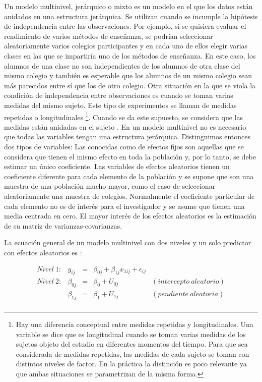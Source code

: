 \documentclass[
  12pt,
  a4paper,
  extrafontsizes,
  onecolumn,
  openright,
  table]{memoir}
\begin{document}
Un modelo multinivel, jerárquico o mixto es un modelo en el que los
datos están anidados en una estructura jerárquica. Se utilizan cuando se
incumple la hipótesis de independencia entre las observaciones. Por
ejemplo, si se quisiera evaluar el rendimiento de varios métodos de
enseñanza, se podrían seleccionar aleatoriamente varios colegios
participantes y en cada uno de ellos elegir varias clases en las que se
impartiría uno de los métodos de enseñanza. En este caso, los alumnos de
una clase no son independientes de los alumnos de otra clase del mismo
colegio y también es esperable que los alumnos de un mismo colegio sean
más parecidos entre sí que los de otro colegio. Otra situación en la que
se viola la condición de independencia entre observaciones es cuando se
toman varias medidas del mismo sujeto. Este tipo de experimentos se
llaman de medidas repetidas o longitudinales \footnote{Hay una
  diferencia conceptual entre medidas repetidas y longitudinales. Una
  variable se dice que es longitudinal cuando se toman varias medidas de
  los sujetos objeto del estudio en diferentes momentos del tiempo. Para
  que sea considerada de medidas repetidas, las medidas de cada sujeto
  se toman con distintos niveles de factor. En la práctica la distinción
  es poco relevante ya que ambas situaciones se parametrizan de la misma
  forma.}. Cuando se da este supuesto, se considera que las medidas
están anidadas en el sujeto \autocite[ver][]{Liu2202}. En un modelo
multinivel no es necesario que todas las variables tengan una estructura
jerárquica. Distinguimos entonces dos tipos de variables: Las conocidas
como de efectos fijos son aquellas que se considera que tienen el mismo
efecto en toda la población y, por lo tanto, se debe estimar un único
coeficiente. Las variables de efectos aleatorios tienen un coeficiente
diferente para cada elemento de la población y se supone que son una
muestra de una población mucho mayor, como el caso de seleccionar
aleatoriamente una muestra de colegios. Normalmente el coeficiente
particular de cada elemento no es de interés para el investigador y se
asume que tienen una media centrada en cero. El mayor interés de los
efectos aleatorios es la estimación de su matriz de
varianzas-covarianzas.

La ecuación general de un modelo multinivel con dos niveles y un solo
predictor con efectos aleatorios es \autocite[ver][pp.~40]{chen2021}:

\[
\begin{aligned}
Nivel\ 1: & y_{ij}     & = & \beta_{0j} + \beta_{1j}x_{1ij} + \epsilon_{ij} \\
Nivel\ 2: & \beta_{0j} & = & \beta_{0} + U_{0j} & (intercepto\ aleatorio) \\
          & \beta_{1j} & = & \beta_{1} + U_{1j} & (pendiente\ aleatoria) \\
\end{aligned}
\]
\end{document}
